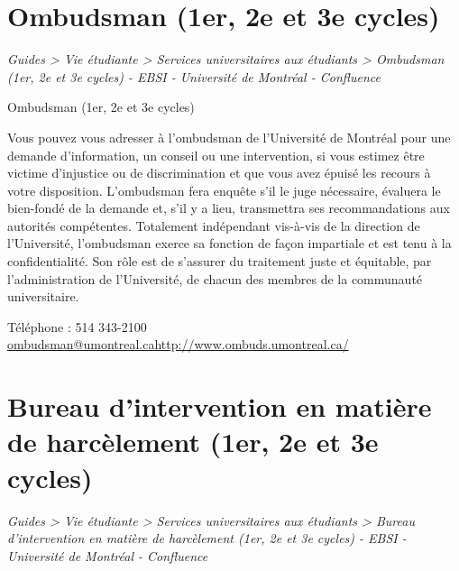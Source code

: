 \documentclass [12 pt]{article}
\begin{document}
        
    
    
        \newpage
        \section {
        Ombudsman (1er, 2e et 3e cycles)
        }
        
        
        
        \textit{
        Guides > Vie étudiante > Services universitaires aux étudiants > Ombudsman
            (1er, 2e et 3e cycles) - EBSI - Université de Montréal - Confluence
        }
    
        Ombudsman (1er, 2e et 3e cycles)
        
            Vous pouvez vous adresser à l'ombudsman de l'Université de Montréal pour une demande
                d'information, un conseil ou une intervention, si vous estimez être victime
                d'injustice ou de discrimination et que vous avez épuisé les recours à votre
                disposition.
            L'ombudsman fera enquête s'il le juge nécessaire, évaluera le bien-fondé de la
                demande et, s'il y a lieu, transmettra ses recommandations aux autorités
                compétentes. Totalement indépendant vis-à-vis de la direction de l'Université,
                l'ombudsman exerce sa fonction de façon impartiale et est tenu à la confidentialité.
                Son rôle est de s'assurer du traitement juste et équitable, par l'administration de
                l'Université, de chacun des membres de la communauté universitaire.
            
                Téléphone : 514 343-2100
        \href{
        http://www.ombuds.umontreal.ca/
        } {
        ombudsman@umontreal.cahttp://www.ombuds.umontreal.ca/
        }
    
            
        
    
    
        \newpage
        \section {
        Bureau d'intervention en matière de harcèlement (1er, 2e et 3e cycles)
        }
        
        
        
        \textit{
        Guides > Vie étudiante > Services universitaires aux étudiants > Bureau
            d'intervention en matière de harcèlement (1er, 2e et 3e cycles) - EBSI - Université
            de Montréal - Confluence
        }
    
\end{document}
